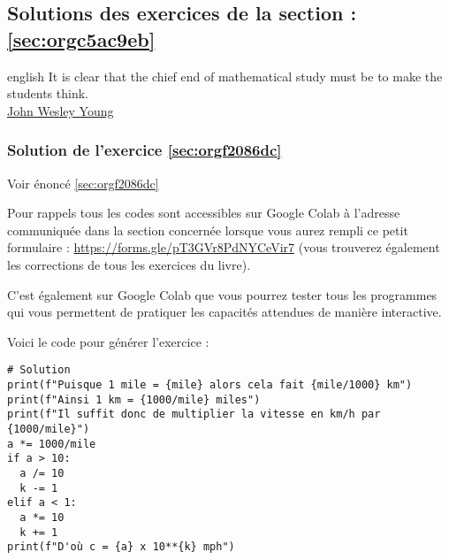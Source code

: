 \documentclass[a4paper, 11pt, twoside]{article}
\begin{document}
\subsection{Solutions des exercices de la section : \ref{sec:orgc5ac9eb}}
\label{sec:org070e855}

\begin{foreigndisplayquote}{english}
It is clear that the chief end of mathematical study must be to
make the students think.\\

\href{https://en.wikipedia.org/wiki/John\_Wesley\_Young}{John Wesley Young}
\end{foreigndisplayquote}

\startcontents[level-2]

\subsubsection{Solution de l'exercice \ref{sec:orgf2086dc}}
\label{sec:org9b19106}
Voir énoncé \ref{sec:orgf2086dc}

Pour rappels tous les codes sont accessibles sur Google Colab à
l'adresse communiquée dans la section concernée lorsque vous
aurez rempli ce petit formulaire :
\url{https://forms.gle/pT3GVr8PdNYCeVir7} (vous trouverez également
les corrections de tous les exercices du livre).

C'est également sur Google Colab que vous pourrez tester tous les
programmes qui vous permettent de pratiquer les capacités attendues
de manière interactive.

Voici le code pour générer l'exercice :
\begin{verbatim}
# Solution
print(f"Puisque 1 mile = {mile} alors cela fait {mile/1000} km")
print(f"Ainsi 1 km = {1000/mile} miles")
print(f"Il suffit donc de multiplier la vitesse en km/h par {1000/mile}")
a *= 1000/mile
if a > 10:
  a /= 10
  k -= 1
elif a < 1:
  a *= 10
  k += 1
print(f"D'où c = {a} x 10**{k} mph")
\end{verbatim}
\stopcontents[level-2]
\stopcontents[level-1]
\end{document}
